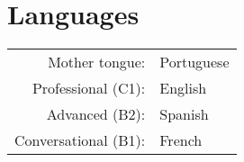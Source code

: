 \section{Languages}

\begin{tabular}{rp{10cm}}
    Mother tongue: & Portuguese \\
    Professional (C1): & English \\
    Advanced (B2): & Spanish \\
    Conversational (B1): & French \\
\end{tabular}
